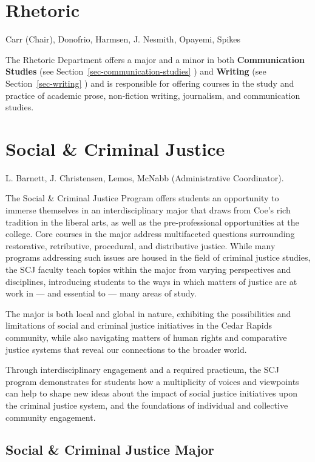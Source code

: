 \documentclass[
  letterpaper,
]{scrbook}
\begin{document}
\section{Rhetoric}\label{rhetoric}

Carr (Chair), Donofrio, Harmsen, J. Nesmith, Opayemi, Spikes

The Rhetoric Department offers a major and a minor in both
\textbf{Communication Studies} (see
Section~\ref{sec-communication-studies} ) and \textbf{Writing} (see
Section~\ref{sec-writing} ) and is responsible for offering courses in
the study and practice of academic prose, non-fiction writing,
journalism, and communication studies.

\section{Social \& Criminal Justice}\label{social-criminal-justice}

L. Barnett, J. Christensen, Lemos, McNabb (Administrative Coordinator).

The Social \& Criminal Justice Program offers students an opportunity to
immerse themselves in an interdisciplinary major that draws from Coe's
rich tradition in the liberal arts, as well as the pre-professional
opportunities at the college. Core courses in the major address
multifaceted questions surrounding restorative, retributive, procedural,
and distributive justice. While many programs addressing such issues are
housed in the field of criminal justice studies, the SCJ faculty teach
topics within the major from varying perspectives and disciplines,
introducing students to the ways in which matters of justice are at work
in --- and essential to --- many areas of study.

The major is both local and global in nature, exhibiting the
possibilities and limitations of social and criminal justice initiatives
in the Cedar Rapids community, while also navigating matters of human
rights and comparative justice systems that reveal our connections to
the broader world.

Through interdisciplinary engagement and a required practicum, the SCJ
program demonstrates for students how a multiplicity of voices and
viewpoints can help to shape new ideas about the impact of social
justice initiatives upon the criminal justice system, and the
foundations of individual and collective community engagement.

\subsection{Social \& Criminal Justice
Major}\label{social-criminal-justice-major}
\end{document}
